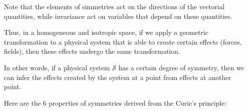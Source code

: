 	\begin{tcolorbox}[title=Remark,colframe=black,arc=10pt]
	Note that the elements of simmetries act on the directions of the vectorial quantities, while invariance act on variables that depend on these quantities.
	\end{tcolorbox}
	Thus, in a homogeneous and isotropic space, if we apply a geometric transformation to a physical system that is able to create certain effects (forces, fields), then these effects undergo the same transformation.

	In other words, if a physical system $\mathcal{S}$ has a certain degree of symmetry, then we can infer the effects created by the system at a point from effects at another point.

	Here are the $6$ properties of symmetries derived from the Curie's principle:
	
